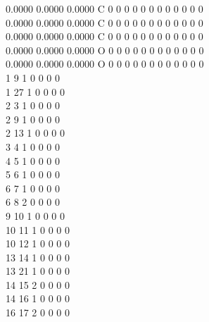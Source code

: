 \documentclass[11pt,titlepage,dvipdfmx,twoside]{jarticle}
\begin{document}
\begin{oframed}
{    0.0000    0.0000    0.0000  C  0  0  0  0  0  0  0  0  0  0  0  0      \\
    0.0000    0.0000    0.0000  C  0  0  0  0  0  0  0  0  0  0  0  0      \\
    0.0000    0.0000    0.0000  C  0  0  0  0  0  0  0  0  0  0  0  0      \\
    0.0000    0.0000    0.0000  O  0  0  0  0  0  0  0  0  0  0  0  0      \\
    0.0000    0.0000    0.0000  O  0  0  0  0  0  0  0  0  0  0  0  0      \\
  1  9  1  0  0  0  0                                                      \\
  1 27  1  0  0  0  0                                                      \\
  2  3  1  0  0  0  0                                                      \\
  2  9  1  0  0  0  0                                                      \\
  2 13  1  0  0  0  0                                                      \\
  3  4  1  0  0  0  0                                                      \\
  4  5  1  0  0  0  0                                                      \\
  5  6  1  0  0  0  0                                                      \\
  6  7  1  0  0  0  0                                                      \\
  6  8  2  0  0  0  0                                                      \\
  9 10  1  0  0  0  0                                                      \\
 10 11  1  0  0  0  0                                                      \\
 10 12  1  0  0  0  0                                                      \\
 13 14  1  0  0  0  0                                                      \\
 13 21  1  0  0  0  0                                                      \\
 14 15  2  0  0  0  0                                                      \\
 14 16  1  0  0  0  0                                                      \\
 16 17  2  0  0  0  0                                                      \\
}
\end{oframed}
\end{document}
